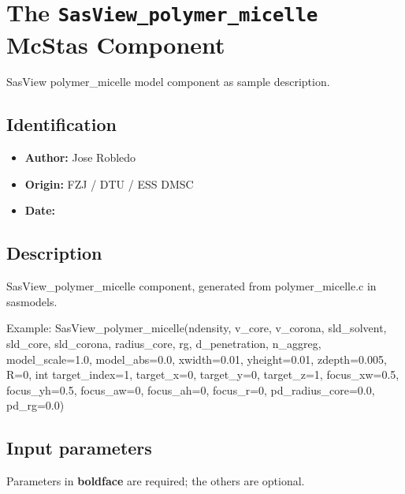 \section{The \texttt{SasView\_polymer\_micelle} McStas Component}
SasView polymer\_micelle model component as sample description.

\subsection*{Identification}
\begin{itemize}
  \item \textbf{Author:} Jose Robledo
  \item \textbf{Origin:} FZJ / DTU / ESS DMSC
  \item \textbf{Date:} 
\end{itemize}

\subsection*{Description}
SasView\_polymer\_micelle component, generated from polymer\_micelle.c in sasmodels.

Example: SasView\_polymer\_micelle(ndensity, v\_core, v\_corona, sld\_solvent, sld\_core, sld\_corona, radius\_core, rg, d\_penetration, n\_aggreg, model\_scale=1.0, model\_abs=0.0, xwidth=0.01, yheight=0.01, zdepth=0.005, R=0, int target\_index=1, target\_x=0, target\_y=0, target\_z=1, focus\_xw=0.5, focus\_yh=0.5, focus\_aw=0, focus\_ah=0, focus\_r=0, pd\_radius\_core=0.0, pd\_rg=0.0)

\subsection*{Input parameters}
Parameters in \textbf{boldface} are required; the others are optional.

